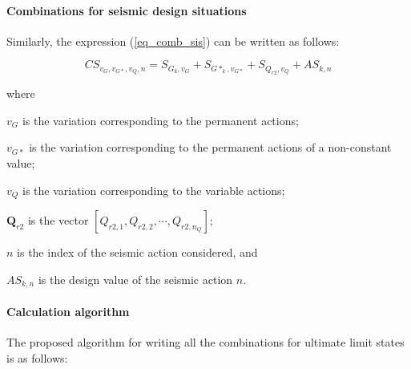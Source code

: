 \paragraph{Combinations for seismic design situations}
Similarly, the expression (\ref{eq_comb_sis}) can be written as follows:

\begin{equation}
CS_{v_G,v_{G*},v_Q,n}= S_{G_k,v_G}+S_{G*_k,v_{G*}}+S_{Q_{r2},v_Q}+ AS_{k,n}
\end{equation}

\noindent where
\begin{description}
\item{$v_G$} is the variation corresponding to the permanent actions;
\item{$v_{G*}$} is the variation corresponding to the permanent actions of a non-constant value;
\item{$v_{Q}$} is the variation corresponding to the variable actions;
\item{$\mathbf{Q}_{r2}$} is the vector $[Q_{r2,1}, Q_{r2,2}, \cdots, Q_{r2,n_Q}]$;
\item{$n$} is the index of the seismic action considered, and
\item{$AS_{k,n}$} is the design value of the seismic action $n$.
\end{description}

\paragraph{Calculation algorithm}
The proposed algorithm for writing all the combinations for ultimate limit states is as follows:


